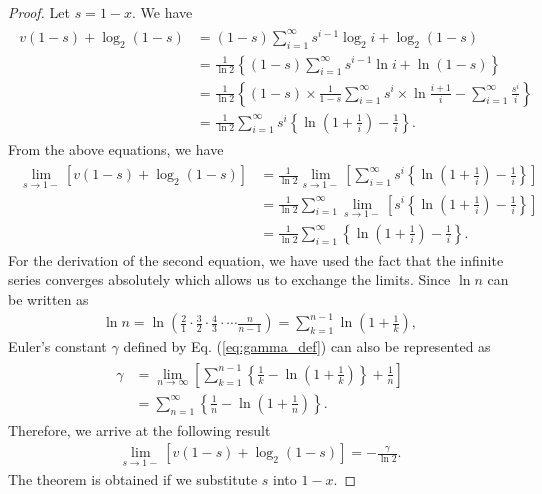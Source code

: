 \begin{proof}
Let $s=1-x$. We have
\begin{align}\begin{split}
	v(1-s) + \log_2 (1-s) 
	&= (1-s)\sum_{i=1}^{\infty} s^{i-1}\log_2 i + \log_2 (1-s) \\
	&= \frac{1}{\ln2} \left\{ (1-s) \sum_{i=1}^{\infty}s^{i-1}\ln i + \ln(1-s) \right\} \\
	&= \frac{1}{\ln2} \left\{ (1-s)\times \frac{1}{1-s} \sum_{i=1}^{\infty}s^{i} \times \ln \frac{i+1}{i} - \sum_{i=1}^{\infty} \frac{s^i}{i} \right\} \\
	&= \frac{1}{\ln2} \sum_{i=1}^{\infty}s^{i} \left\{ \ln \left(1+\frac{1}{i}\right) - \frac{1}{i} \right\}.
\end{split}\end{align}
From the above equations, we have
\begin{align}\begin{split}
	\lim_{s\to 1-} \left[ v(1-s) + \log_2 (1-s) \right] 
	&=\frac{1}{\ln2} \lim_{s\to 1-} \left[ \sum_{i=1}^{\infty} s^{i} \left\{ \ln \left(1+\frac{1}{i}\right) - \frac{1}{i} \right\} \right]\\
	&=\frac{1}{\ln2} \sum_{i=1}^{\infty} \lim_{s\to 1-} \left[ s^{i} \left\{ \ln \left(1+\frac{1}{i}\right) - \frac{1}{i} \right\} \right] \\
	&=\frac{1}{\ln2} \sum_{i=1}^{\infty}\left\{ \ln \left(1+\frac{1}{i}\right) - \frac{1}{i} \right\}.
\end{split}\end{align}
For the derivation of the second equation, we have used the fact that the infinite series converges absolutely which allows us to exchange the limits. 
%
Since $\ln n$ can be written as 
\begin{align}
	\ln n = \ln \left( \frac{2}{1}\cdot\frac{3}{2}\cdot\frac{4}{3}\cdot\cdots\frac{n}{n-1}\right) = \sum_{k=1}^{n-1}\ln\left(1+\frac{1}{k}\right),
\end{align}
Euler's constant $\gamma$ defined by Eq. (\ref{eq:gamma_def}) can also be represented as
\begin{align}\begin{split}
	\gamma &= \lim_{n\to\infty} \left[ \sum_{k=1}^{n-1}\left\{ \frac{1}{k} - \ln \left(1+\frac{1}{k}\right)\right\} + \frac{1}{n} \right] \\
	&=\sum_{n=1}^{\infty}\left\{ \frac{1}{n} - \ln \left(1+\frac{1}{n}\right) \right\}.
\end{split}\end{align}
Therefore, we arrive at the following result
\begin{align}
	\lim_{s\to 1-} \left[ v(1-s) + \log_2 (1-s) \right]  =- \frac{\gamma}{\ln 2}.
\end{align}
The theorem is obtained if we substitute $s$ into $1-x$.
\end{proof}